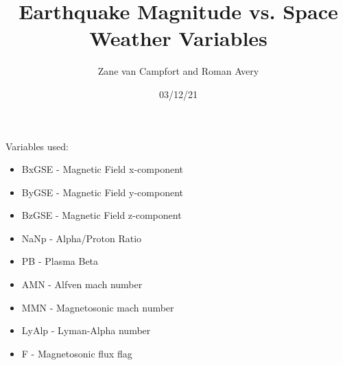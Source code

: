 \documentclass[12pt]{article}
\title{Earthquake Magnitude vs. Space Weather Variables}
\author{Zane van Campfort and Roman Avery}
\date{03/12/21}
\begin{document}
\maketitle
\begin{large}
Variables used:

\begin{itemize}
  \item BxGSE - Magnetic Field x-component
  \item ByGSE - Magnetic Field y-component
  \item BzGSE - Magnetic Field z-component
  \item NaNp - Alpha/Proton Ratio
  \item PB - Plasma Beta
  \item AMN - Alfven mach number
  \item MMN - Magnetosonic mach number
  \item LyAlp - Lyman-Alpha number
  \item F - Magnetosonic flux flag
\end{itemize}
\end{large}

\graphicspath{{../plots/03_12/}}


\newpage
\end{document}
